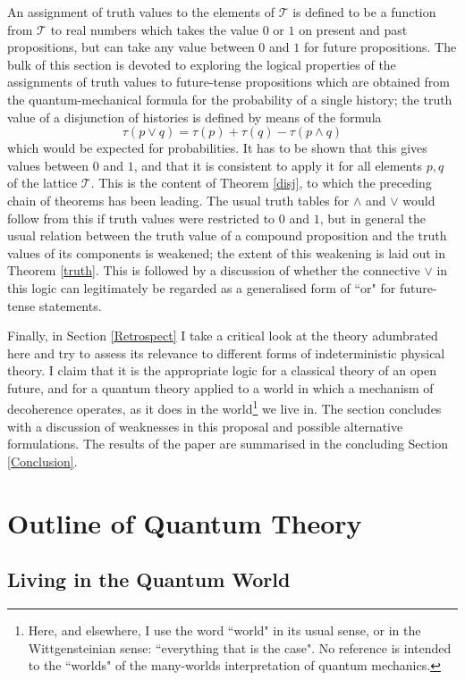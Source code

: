 \documentclass[12pt,reqno]{article}
\renewcommand{\(}{\left(}
\renewcommand{\)}{\right)}
\newcommand{\T}{\mathcal{T}}
\newcommand{\<}{\langle}
\renewcommand{\>}{\rangle}
\theoremstyle{plain} %
\begin{document}
An assignment of truth values to the elements of $\T$ is defined to be a function from $\T$ to real numbers which takes the value $0$ or $1$ on present and past propositions, but can take any value between $0$ and $1$ for future propositions. The bulk of this section is devoted to exploring the logical properties of the assignments of truth values to future-tense propositions which are obtained from the quantum-mechanical formula for the probability of a single history; the truth value of a disjunction of histories is defined by means of the formula
\[
\tau(p\lor q) = \tau(p) + \tau(q) - \tau(p\land q)
\]
which would be expected for probabilities. It has to be shown that this gives values between $0$ and $1$, and that it is consistent to apply it for all elements $p,q$ of the lattice $\T$. This is the content of Theorem \ref{disj}, to which the preceding chain of theorems has been leading. The usual truth tables for $\land$ and $\lor$ would follow from this if truth values were restricted to $0$ and $1$, but in general the usual relation between the truth value of a compound proposition and the truth values of its components is weakened; the extent of this weakening is laid out in Theorem \ref{truth}. This is followed by a discussion of whether the connective $\lor$ in this logic can legitimately be regarded as a generalised form of ``or" for future-tense statements.

Finally, in Section \ref{Retrospect} I take a critical look at the theory adumbrated here and try to assess its relevance to different forms of indeterministic physical theory. I claim that it is the appropriate logic for a classical theory of an open future, and for a quantum theory applied to a world in which a mechanism of decoherence operates, as it does in the world\footnote{Here, and elsewhere, I use the word ``world" in its usual sense, or in the Wittgensteinian sense: ``everything that is the case". No reference is intended to the ``worlds" of the many-worlds interpretation of quantum mechanics.} we live in. The section concludes with a discussion of weaknesses in this proposal and possible alternative formulations. The results of the paper are summarised in the concluding Section \ref{Conclusion}.

\section{Outline of Quantum Theory}
\label{sec:quantum}

\subsection{Living in the Quantum World}
\label{subsec:qworld}
\end{document}
